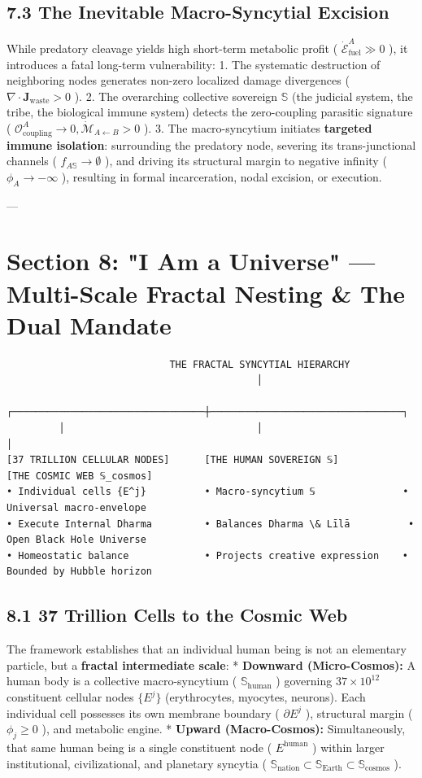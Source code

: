 \documentclass[11pt,a4paper]{article}
\theoremstyle{definition}
\theoremstyle{remark}
\begin{document}
\subsection{7.3 The Inevitable Macro-Syncytial Excision}
While predatory cleavage yields high short-term metabolic profit ( $\dot{\mathcal{E}}_{\text{fuel}}^A \gg 0$ ), it introduces a fatal long-term vulnerability:
1. The systematic destruction of neighboring nodes generates non-zero localized damage divergences ( $\nabla \cdot \mathbf{J}_{\text{waste}} > 0$ ).
2. The overarching collective sovereign $\mathbb{S}$ (the judicial system, the tribe, the biological immune system) detects the zero-coupling parasitic signature ( $\mathcal{O}_{\text{coupling}}^A \to 0, \dot{\mathcal{M}}_{A \leftarrow B} > 0$ ).
3. The macro-syncytium initiates \textbf{targeted immune isolation}: surrounding the predatory node, severing its trans-junctional channels ( $f_{A \mathbb{S}} \to \emptyset$ ), and driving its structural margin to negative infinity ( $\phi_A \to -\infty$ ), resulting in formal incarceration, nodal excision, or execution.

---

\section{Section 8: "I Am a Universe" — Multi-Scale Fractal Nesting \& The Dual Mandate}

\begin{verbatim}
                            THE FRACTAL SYNCYTIAL HIERARCHY
                                           │
         ┌─────────────────────────────────┼─────────────────────────────────┐
         │                                 │                                 │
[37 TRILLION CELLULAR NODES]      [THE HUMAN SOVEREIGN 𝕊]           [THE COSMIC WEB 𝕊_cosmos]
• Individual cells {E^j}          • Macro-syncytium 𝕊               • Universal macro-envelope
• Execute Internal Dharma         • Balances Dharma \& Līlā          • Open Black Hole Universe
• Homeostatic balance             • Projects creative expression    • Bounded by Hubble horizon
\end{verbatim}

\subsection{8.1 37 Trillion Cells to the Cosmic Web}
The framework establishes that an individual human being is not an elementary particle, but a \textbf{fractal intermediate scale}:
* \textbf{Downward (Micro-Cosmos):} A human body is a collective macro-syncytium ( $\mathbb{S}_{\text{human}}$ ) governing $37 \times 10^{12}$ constituent cellular nodes $\{E^j\}$ (erythrocytes, myocytes, neurons). Each individual cell possesses its own membrane boundary ( $\partial E^j$ ), structural margin ( $\phi_j \ge 0$ ), and metabolic engine.
* \textbf{Upward (Macro-Cosmos):} Simultaneously, that same human being is a single constituent node ( $E^{\text{human}}$ ) within larger institutional, civilizational, and planetary syncytia ( $\mathbb{S}_{\text{nation}} \subset \mathbb{S}_{\text{Earth}} \subset \mathbb{S}_{\text{cosmos}}$ ).
\end{document}
